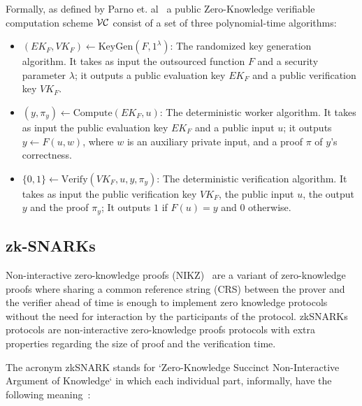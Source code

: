 Formally, as defined by Parno et. al~\cite{pinocchio-nearly-practical-verifiable-computation} a public Zero-Knowledge verifiable computation scheme $\mathcal{V} \mathcal{C}$ consist of a set of three polynomial-time algorithms:

\begin{itemize}
  \item $(EK_F, VK_F) \leftarrow \text{KeyGen}(F, 1^{\lambda})$: The randomized key generation algorithm. It takes as input the outsourced function $F$ and a security parameter ${\lambda}$; it outputs a public evaluation key $EK_F$ and a public verification key $VK_F$.
  \item $(y, \pi_y) \leftarrow \text{Compute}(EK_F, u)$: The deterministic worker algorithm. It takes as input the public evaluation key $EK_F$ and a public input $u$; it outputs $y \leftarrow F(u, w)$, where $w$ is an auxiliary private input, and a proof $\pi$ of $y$'s correctness.
  \item $\{0, 1\} \leftarrow \text{Verify}(VK_F, u, y, \pi_y)$:  The deterministic verification algorithm. It takes as input the public verification key $VK_F$, the public input $u$, the output $y$ and the proof $\pi_y$; It outputs $1$ if $F(u) = y$ and $0$ otherwise.
\end{itemize}

\subsection{zk-SNARKs}
\label{zkp:snarks}

Non-interactive zero-knowledge proofs (NIKZ)~\cite{Blum:1991:NZ:123137.123145} are a variant of zero-knowledge proofs where sharing a common reference string (CRS) between the prover and the verifier ahead of time is enough to implement zero knowledge protocols without the need for interaction by the participants of the protocol. zkSNARKs protocols are non-interactive zero-knowledge proofs protocols with extra properties regarding the size of proof and the verification time.

The acronym zkSNARK stands for `Zero-Knowledge Succinct Non-Interactive Argument of Knowledge` in which each individual part, informally, have the following meaning~\cite{zksnarks_nutshell, zcash, 184425, Bitansky:2012:ECR:2090236.2090263, zksnark_basics}:

